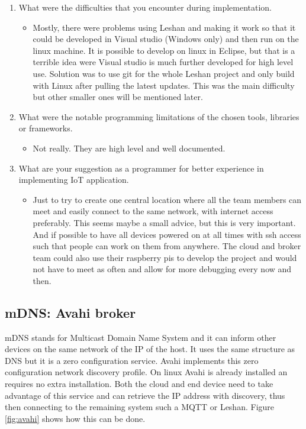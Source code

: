 \documentclass[11pt]{article}
\begin{document}
\begin{enumerate}
\begin{itemize}
	\end{itemize}
	\item What were the difficulties that you encounter during implementation.
	\begin{itemize}
		\item Mostly, there were problems using Leshan and making it work so that it could be developed in Visual studio (Windows only) and then run on the linux machine. It is possible to develop on linux in Eclipse, but that is a terrible idea were Visual studio is much further developed for high level use. Solution was to use git for the whole Leshan project and only build with Linux after pulling the latest updates. This was the main difficulty but other smaller ones will be mentioned later.
	\end{itemize}
	\item What were the notable programming limitations of the chosen tools, libraries or frameworks.
	\begin{itemize}
		\item Not really. They are high level and well documented.
	\end{itemize}
	\item  What are your suggestion as a programmer for better experience in implementing IoT application. 
	\begin{itemize}
		\item Just to try to create one central location where all the team members can meet and easily connect to the same network, with internet access preferably. This seems maybe a small advice, but this is very important. And if possible to have all devices powered on at all times with ssh access such that people can work on them from anywhere. The cloud and broker team could also use their raspberry pis to develop the project and would not have to meet as often and allow for more debugging every now and then.
	\end{itemize}

\end{enumerate}



\subsection{mDNS: Avahi broker}
mDNS stands for Multicast Domain Name System and it can inform other devices on the same network of the IP of the host. It uses the same structure as DNS but it is a zero configuration service. Avahi implements this zero configuration network discovery profile. On linux Avahi is already installed an requires no extra installation. Both the cloud and end device need to take advantage of this service and can retrieve the IP address with discovery, thus then connecting to the remaining system such a MQTT or Leshan. Figure \ref{fig:avahi} shows how this can be done.
\end{document}
